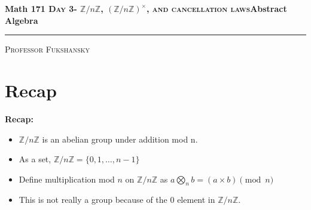\documentclass[12pt]{report}
\newcommand{\recap}[1]{{\leavevmode\color{teal} #1}}
\begin{document}
	\begin{center} 
		\textbf{Math 171  \hfill  \textsc{Day 3- $\mathbb{Z}/n\mathbb{Z}$, $(\mathbb{Z}/n\mathbb{Z})^\times$, and cancellation laws}\hfill Abstract Algebra}
		\rule{\linewidth}{.01in}
		\vskip 0.01in
	\end{center}
	\textsc{Professor Fukshansky}\\
	\vskip 0.05in
	\section{Recap}
	\recap{
		\textbf{Recap: }
		\begin{itemize}
			\item $\mathbb{Z}/n\mathbb{Z}$ is an abelian group under addition mod n.
			\item As a set, $\mathbb{Z}/n\mathbb{Z}=\{0,1,\dots,n-1\}$
			\item Define multiplication mod $n$ on $\mathbb{Z}/n\mathbb{Z}$ as $a\bigotimes_n b=(a\times b)\pmod n$
			\item This is not really a group because of the 0 element in $\mathbb{Z}/n\mathbb{Z}$. 
		\end{itemize}
	}
\end{document}
